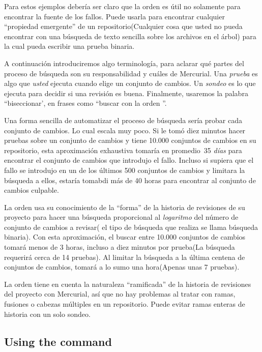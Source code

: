 Para estos ejemplos debería ser claro que la orden 
es útil no solamente para encontrar la fuente de los fallos. Puede
usarla para encontrar cualquier ``propiedad emergente'' de un
repositorio(Cualquier cosa que usted no pueda encontrar con una
búsqueda de texto sencilla sobre los archivos en el árbol) para la
cual pueda escribir una prueba binaria.

A continuación introduciremos algo terminología, para aclarar qué
partes del proceso de búsqueda son su responsabilidad y cuáles de
Mercurial.  Una \emph{prueba} es algo que \emph{usted} ejecuta cuando
 elige un conjunto de cambios.  Un \emph{sondeo} es lo que
 ejecuta para decidir si una revisión es buena.  Finalmente,
usaremos la palabra ``biseccionar', en frases como ``buscar con la
orden ''.

Una forma sencilla de automatizar el proceso de búsqueda sería probar
cada conjunto de cambios.  Lo cual escala muy poco. Si le tomó diez
minutos hacer pruebas sobre un conjunto de cambios y tiene 10.000
conjuntos de cambios en su repositorio, esta aproximación exhaustiva
tomaría en promedio~35 \emph{días} para encontrar el conjunto de
cambios que introdujo el fallo. Incluso si supiera que el fallo se
introdujo en un de los últimos 500 conjuntos de cambios y limitara la
búsqueda a ellos, estaría tomabdi más de 40 horas para encontrar al
conjunto de cambios culpable.

La orden  usa su conocimiento de la ``forma'' de la
historia de revisiones de su proyecto para hacer una búsqueda
proporcional al \emph{logaritmo} del número de conjunto de cambios a
revisar( el tipo de búsqueda que realiza se llama búsqueda
binaria). Con esta aproximación, el buscar entre 10.000 conjuntos de
cambios tomará menos de 3 horas, incluso a diez minutos por prueba(La
búsqueda requerirá cerca de 14 pruebas). Al limitar la búsqueda a la
última centena de conjuntos de cambios, tomará a lo sumo una
hora(Apenas unas 7 pruebas).

La orden  tiene en cuenta la naturaleza ``ramificada''
de la historia de revisiones del proyecto con Mercurial, así que no
hay problemas al tratar con ramas, fusiones o cabezas múltiples en un
repositorio.  Puede evitar ramas enteras de historia con un solo
sondeo.

\subsection{Using the  command}

